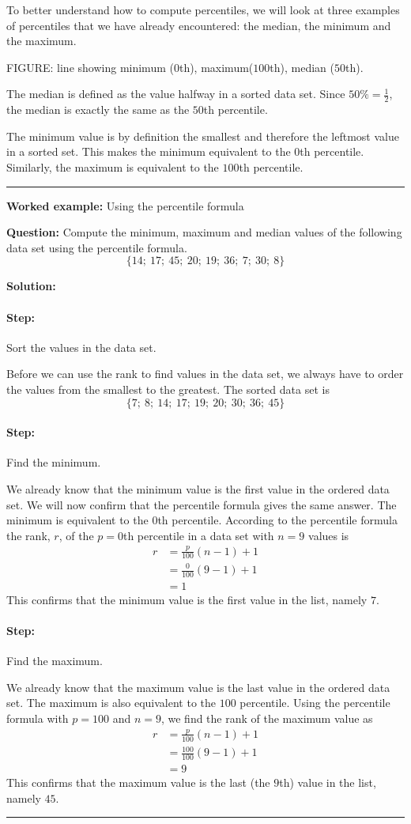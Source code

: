 \documentclass[a4paper,11pt]{report}
\newenvironment{wex}[3]%
{\rule{\linewidth}{0.5mm}
\textbf{Worked example:} #1

\textbf{Question:} #2

\textbf{Solution:} #3}%
{\rule{\linewidth}{0.5mm}}
\newcommand{\westep}[1]{\paragraph{Step:} #1}
\begin{document}
To better understand how to compute percentiles, we will look at three
examples of percentiles that we have already encountered: the median,
the minimum and the maximum.

FIGURE: line showing minimum ($0$th), maximum($100$th), median ($50$th).

The median is defined as the value halfway in a sorted data set. Since
$50\% = \frac{1}{2}$, the median is exactly the same as the $50$th
percentile.

The minimum value is by definition the smallest and therefore the
leftmost value in a sorted set. This makes the minimum equivalent to
the $0$th percentile. Similarly, the maximum is equivalent to the $100$th
percentile.

\begin{wex}{Using the percentile formula}{
    Compute the minimum, maximum and median values of the following
    data set using the percentile formula.
    \begin{equation}
      \{14;\ 17;\ 45;\ 20;\ 19;\ 36;\ 7;\ 30;\ 8\}
    \end{equation}
}{
    \westep{Sort the values in the data set.}

    Before we can use the rank to find values in the data set, we
    always have to order the values from the smallest to the
    greatest. The sorted data set is
    \begin{equation}
      \{7;\ 8;\ 14;\ 17;\ 19;\ 20;\ 30;\ 36;\ 45\}
    \end{equation}

    \westep{Find the minimum.}

    We already know that the minimum value is the first value in the
    ordered data set. We will now confirm that the percentile formula
    gives the same answer. The minimum is equivalent to the $0$th
    percentile. According to the percentile formula the rank, $r$, of the
    $p = 0$th percentile in a data set with $n=9$ values is
    \begin{align}
      r &= \frac{p}{100}\left(n-1\right)+1 \\
        &= \frac{0}{100}\left(9-1\right)+1 \\
        &= 1
    \end{align}
    This confirms that the minimum value is the first value in the
    list, namely $7$.

    \westep{Find the maximum.}

    We already know that the maximum value is the last value in the
    ordered data set. The maximum is also equivalent to the $100$
    percentile. Using the percentile formula with $p=100$ and $n=9$,
    we find the rank of the maximum value as
    \begin{align}
      r &= \frac{p}{100}\left(n-1\right)+1 \\
        &= \frac{100}{100}\left(9-1\right)+1 \\
        &= 9
    \end{align}
    This confirms that the maximum value is the last (the $9$th) value
    in the list, namely $45$.

}
\end{wex}
\end{document}
